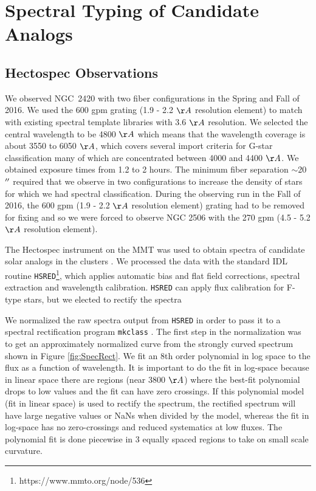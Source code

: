\documentclass{aastex6}
\begin{document}
\clearpage
\section{Spectral Typing of Candidate Analogs}

\subsection{Hectospec Observations}
We observed NGC~2420 with two fiber configurations in the Spring and Fall of 2016.
We used the 600 gpm grating (1.9 - 2.2 $\AA$ resolution element) to match with existing spectral template libraries with 3.6 $\AA$ resolution.
We selected the central wavelength to be 4800 $\AA$ which means that the wavelength coverage is about 3550 to 6050 $\AA$, which covers several import criteria for G-star classification many of which are concentrated between 4000 and 4400 $\AA$.
We obtained exposure times from 1.2 to 2 hours.
The minimum fiber separation $\sim$20$\mbox{$^{\prime\prime}$}$ required that we observe in two configurations to increase the density of stars for which we had spectral classification.
During the observing run in the Fall of 2016, the 600 gpm (1.9 - 2.2 $\AA$ resolution element) grating had to be removed for fixing and so we were forced to observe NGC 2506 with the 270 gpm (4.5 - 5.2 $\AA$ resolution element).

The Hectospec instrument on the MMT \citep{fabricant2005hectospec,mink2007hectoFibers} was used to obtain spectra of candidate solar analogs in the clusters .
We processed the data with the standard IDL routine \texttt{HSRED}\footnote{https://www.mmto.org/node/536}, which applies automatic bias and flat field corrections, spectral extraction and wavelength calibration.
\texttt{HSRED} can apply flux calibration for F-type stars, but we elected to rectify the spectra 

We normalized the raw spectra output from \texttt{HSRED} in order to pass it to a spectral rectification program \texttt{mkclass} \citep{gray2014classification}.
The first step in the normalization was to get an approximately normalized curve from the strongly curved spectrum shown in Figure \ref{fig:SpecRect}.
We fit an 8th order polynomial in log space to the flux as a function of wavelength.
It is important to do the fit in log-space because in linear space there are regions (near 3800 $\AA$) where the best-fit polynomial drops to low values and the fit can have zero crossings.
If this polynomial model (fit in linear space) is used to rectify the spectrum, the rectified spectrum will have large negative values or NaNs when divided by the model, whereas the fit in log-space has no zero-crossings and reduced systematics at low fluxes.
The polynomial fit is done piecewise in 3 equally spaced regions to take on small scale curvature.
\end{document}
